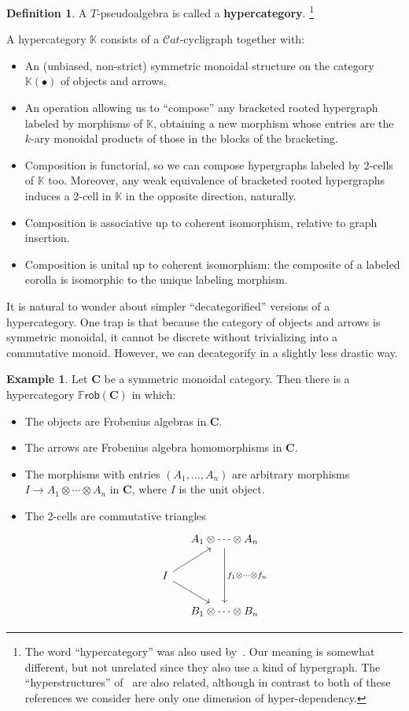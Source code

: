 \documentclass{article}
\theoremstyle{definition}
\newtheorem{defn}[thm]{Definition}
\newtheorem{eg}[thm]{Example}
\theoremstyle{remark}
\def\K{\mathbb{K}}
\def\frob{\mathbb{F}\mathsf{rob}}
\def\Cat{\ensuremath{\mathcal{C}\mathit{at}}}
\def\bC{\ensuremath{\mathbf{C}}\xspace}
\begin{document}
\begin{defn}
  A $T$-pseudoalgebra is called a \textbf{hypercategory}.%
  \footnote{The word ``hypercategory'' was also used by~\cite{hmt:strict-n-hypercats,mt:omega-hypergraphs}.
    Our meaning is somewhat different, but not unrelated since they also use a kind of hypergraph.
    The ``hyperstructures'' of~\cite{baas:higher-structures} are also related, although in contrast to both of these references we consider here only one dimension of hyper-dependency.}
\end{defn}

A hypercategory $\K$ consists of a $\Cat$-cycligraph together with:
\begin{itemize}
\item An (unbiased, non-strict) symmetric monoidal structure on the category $\K(\bullet)$ of objects and arrows.
\item An operation allowing us to ``compose'' any bracketed rooted hypergraph labeled by morphisms of $\K$, obtaining a new morphism whose entries are the $k$-ary monoidal products of those in the blocks of the bracketing.
\item Composition is functorial, so we can compose hypergraphs labeled by 2-cells of $\K$ too.
  Moreover, any weak equivalence of bracketed rooted hypergraphs induces a 2-cell in $\K$ in the opposite direction, naturally.
\item Composition is associative up to coherent isomorphism, relative to graph insertion.
\item Composition is unital up to coherent isomorphism: the composite of a labeled corolla is isomorphic to the unique labeling morphism.
\end{itemize}

It is natural to wonder about simpler ``decategorified'' versions of a hypercategory.
One trap is that because the category of objects and arrows is symmetric monoidal, it cannot be discrete without trivializing into a commutative monoid.
However, we can decategorify in a slightly less drastic way.

\begin{eg}
  Let \bC be a symmetric monoidal category.
  Then there is a hypercategory $\frob(\bC)$ in which:
  \begin{itemize}
  \item The objects are Frobenius algebras in \bC.
  \item The arrows are Frobenius algebra homomorphisms in \bC.
  \item The morphisms with entries $(A_1,\dots,A_n)$ are arbitrary morphisms $I \to A_1\otimes\cdots\otimes A_n$ in \bC, where $I$ is the unit object.
  \item The 2-cells are commutative triangles
    \[
    \begin{tikzcd}[column sep=small]
      & A_1\otimes\cdots\otimes A_n \ar[dd,"f_1\otimes\cdots\otimes f_n"] \\
      I \ar[ur] \ar[dr] \\
      & B_1\otimes\cdots\otimes B_n
    \end{tikzcd}
    \]
  \end{itemize}
\end{eg}
\end{document}
